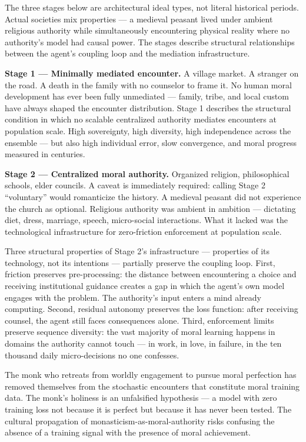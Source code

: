 \documentclass[
]{article}
\begin{document}
The three stages below are architectural ideal types, not literal
historical periods. Actual societies mix properties --- a medieval
peasant lived under ambient religious authority while simultaneously
encountering physical reality where no authority's model had causal
power. The stages describe structural relationships between the agent's
coupling loop and the mediation infrastructure.

\textbf{Stage 1 --- Minimally mediated encounter.} A village market. A
stranger on the road. A death in the family with no counselor to frame
it. No human moral development has ever been fully unmediated ---
family, tribe, and local custom have always shaped the encounter
distribution. Stage 1 describes the structural condition in which no
scalable centralized authority mediates encounters at population scale.
High sovereignty, high diversity, high independence across the ensemble
--- but also high individual error, slow convergence, and moral progress
measured in centuries.

\textbf{Stage 2 --- Centralized moral authority.} Organized religion,
philosophical schools, elder councils. A caveat is immediately required:
calling Stage 2 ``voluntary'' would romanticize the history. A medieval
peasant did not experience the church as optional. Religious authority
was ambient in ambition --- dictating diet, dress, marriage, speech,
micro-social interactions. What it lacked was the technological
infrastructure for zero-friction enforcement at population scale.

Three structural properties of Stage 2's infrastructure --- properties
of its technology, not its intentions --- partially preserve the
coupling loop. First, friction preserves pre-processing: the distance
between encountering a choice and receiving institutional guidance
creates a gap in which the agent's own model engages with the problem.
The authority's input enters a mind already computing. Second, residual
autonomy preserves the loss function: after receiving counsel, the agent
still faces consequences alone. Third, enforcement limits preserve
sequence diversity: the vast majority of moral learning happens in
domains the authority cannot touch --- in work, in love, in failure, in
the ten thousand daily micro-decisions no one confesses.

The monk who retreats from worldly engagement to pursue moral perfection
has removed themselves from the stochastic encounters that constitute
moral training data. The monk's holiness is an unfalsified hypothesis
--- a model with zero training loss not because it is perfect but
because it has never been tested. The cultural propagation of
monasticism-as-moral-authority risks confusing the absence of a training
signal with the presence of moral achievement.
\end{document}
